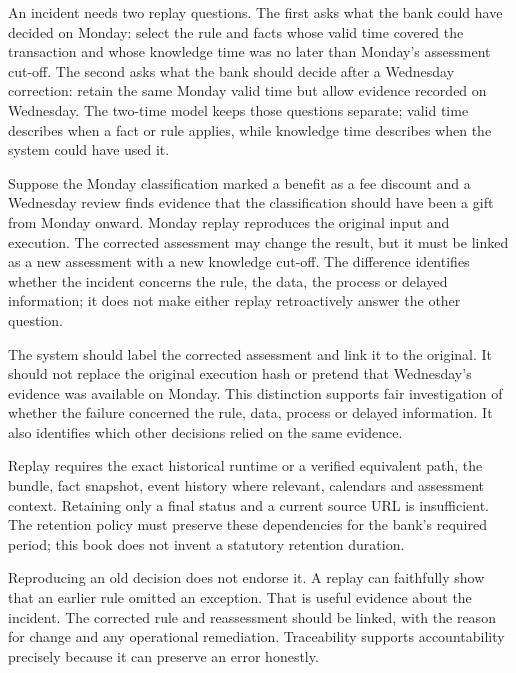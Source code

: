 An incident needs two replay questions. The first asks what the bank could have decided on
Monday: select the rule and facts whose valid time covered the transaction and whose knowledge
time was no later than Monday's assessment cut-off. The second asks what the bank should decide
after a Wednesday correction: retain the same Monday valid time but allow evidence recorded on
Wednesday. The two-time model keeps those questions separate; valid time describes when a fact or rule
applies, while knowledge time describes when the system could have used it.

Suppose the Monday classification marked a benefit as a fee discount and a
Wednesday review finds evidence that the classification should have been a gift
from Monday onward. Monday replay reproduces the original input and execution.
The corrected assessment may change the result, but it must be linked as a new assessment with a
new knowledge cut-off. The difference identifies whether the incident concerns the rule, the data,
the process or delayed information; it does not make either replay retroactively answer the other question.


The system should label the corrected assessment and link it to the original.
It should not replace the original execution hash or pretend that Wednesday's
evidence was available on Monday. This distinction supports fair investigation
of whether the failure concerned the rule, data, process or delayed information.
It also identifies which other decisions relied on the same evidence.

Replay requires the exact historical runtime or a verified equivalent path, the
bundle, fact snapshot, event history where relevant, calendars and assessment
context. Retaining only a final status and a current source URL is insufficient.
The retention policy must preserve these dependencies for the bank's required
period; this book does not invent a statutory retention duration.

Reproducing an old decision does not endorse it. A replay can faithfully show that
an earlier rule omitted an exception. That is useful evidence about the incident.
The corrected rule and reassessment should be linked, with the reason for change
and any operational remediation. Traceability supports accountability precisely
because it can preserve an error honestly.

